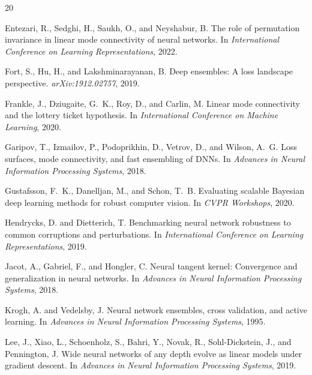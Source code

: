 \documentclass[11pt]{article}
\begin{document}

\begin{thebibliography}{20}

Entezari, R., Sedghi, H., Saukh, O., and Neyshabur, B.
\newblock The role of permutation invariance in linear mode connectivity of
  neural networks.
\newblock In \emph{International Conference on Learning Representations}, 2022.

Fort, S., Hu, H., and Lakshminarayanan, B.
\newblock Deep ensembles: A loss landscape perspective.
\newblock \emph{arXiv:1912.02757}, 2019.

Frankle, J., Dziugaite, G.~K., Roy, D., and Carlin, M.
\newblock Linear mode connectivity and the lottery ticket hypothesis.
\newblock In \emph{International Conference on Machine Learning}, 2020.

Garipov, T., Izmailov, P., Podoprikhin, D., Vetrov, D., and Wilson, A.~G.
\newblock Loss surfaces, mode connectivity, and fast ensembling of DNNs.
\newblock In \emph{Advances in Neural Information Processing Systems}, 2018.

Gustafsson, F.~K., Danelljan, M., and Schon, T.~B.
\newblock Evaluating scalable Bayesian deep learning methods for robust
  computer vision.
\newblock In \emph{CVPR Workshops}, 2020.

Hendrycks, D. and Dietterich, T.
\newblock Benchmarking neural network robustness to common corruptions and
  perturbations.
\newblock In \emph{International Conference on Learning Representations}, 2019.

Jacot, A., Gabriel, F., and Hongler, C.
\newblock Neural tangent kernel: Convergence and generalization in neural
  networks.
\newblock In \emph{Advances in Neural Information Processing Systems}, 2018.

Krogh, A. and Vedelsby, J.
\newblock Neural network ensembles, cross validation, and active learning.
\newblock In \emph{Advances in Neural Information Processing Systems}, 1995.

Lee, J., Xiao, L., Schoenholz, S., Bahri, Y., Novak, R., Sohl-Dickstein, J.,
  and Pennington, J.
\newblock Wide neural networks of any depth evolve as linear models under
  gradient descent.
\newblock In \emph{Advances in Neural Information Processing Systems}, 2019.


\end{thebibliography}
\end{document}
